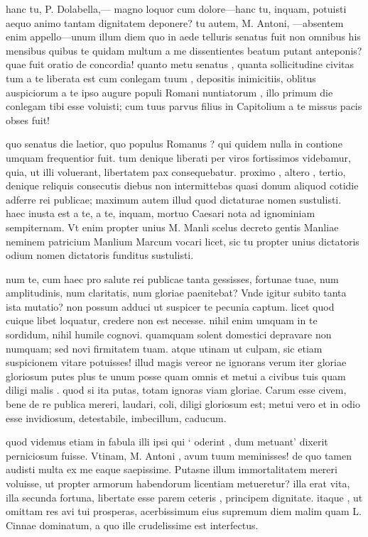  hanc tu, P. Dolabella,— magno loquor cum dolore—hanc tu, inquam, potuisti aequo animo tantam dignitatem deponere? tu autem, M. Antoni, —absentem enim appello—unum illum diem quo in aede telluris senatus fuit non omnibus his mensibus quibus te quidam multum a me dissentientes beatum putant anteponis? quae fuit oratio de concordia! quanto metu senatus , quanta sollicitudine civitas tum a te liberata est cum conlegam tuum , depositis inimicitiis, oblitus auspiciorum a te ipso augure populi Romani nuntiatorum , illo primum die conlegam tibi esse voluisti; cum tuus parvus filius in Capitolium a te missus pacis obses fuit!

 quo senatus die laetior, quo populus Romanus ? qui quidem nulla in contione umquam frequentior fuit. tum denique liberati per viros fortissimos videbamur, quia, ut illi voluerant, libertatem pax consequebatur. proximo , altero , tertio, denique reliquis consecutis diebus non intermittebas quasi donum aliquod cotidie adferre rei publicae; maximum autem illud quod dictaturae nomen sustulisti. haec inusta est a te, a te, inquam, mortuo Caesari nota ad ignominiam sempiternam. Vt enim propter unius M. Manli scelus decreto gentis Manliae neminem patricium Manlium Marcum vocari licet, sic tu propter unius dictatoris odium nomen dictatoris funditus sustulisti.

 num te, cum haec pro salute rei publicae tanta gessisses, fortunae tuae, num amplitudinis, num claritatis, num gloriae paenitebat? Vnde igitur subito tanta ista mutatio? non possum adduci ut suspicer te pecunia captum. licet quod cuique libet loquatur, credere non est necesse. nihil enim umquam in te sordidum, nihil humile cognovi. quamquam solent domestici depravare non numquam; sed novi firmitatem tuam. atque utinam ut culpam, sic etiam suspicionem vitare potuisses! illud magis vereor ne ignorans verum iter gloriae gloriosum putes plus te unum posse quam omnis et metui a civibus tuis quam diligi malis . quod si ita putas, totam ignoras viam gloriae. Carum esse civem, bene de re publica mereri, laudari, coli, diligi gloriosum est; metui vero et in odio esse invidiosum, detestabile, imbecillum, caducum.

 quod videmus etiam in fabula illi ipsi qui ` oderint , dum metuant' dixerit perniciosum fuisse. Vtinam, M. Antoni , avum tuum meminisses! de quo tamen audisti multa ex me eaque saepissime. Putasne illum immortalitatem mereri voluisse, ut propter armorum habendorum licentiam metueretur? illa erat vita, illa secunda fortuna, libertate esse parem ceteris , principem dignitate. itaque , ut omittam res avi tui prosperas, acerbissimum eius supremum diem malim quam L. Cinnae dominatum, a quo ille crudelissime est interfectus.

